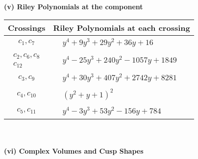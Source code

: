 \documentclass[1p]{elsarticle_modified}
\theoremstyle{definition}
\begin{document}
\newpage\renewcommand{\arraystretch}{1}
\flushleft \textbf{(v) Riley Polynomials at the component}\newline \\
\begin{tabular}{m{50pt}|m{274pt}}
Crossings & \hspace{64pt}Riley Polynomials at each crossing \\
\hline $$\begin{aligned}c_{1},c_{7}\end{aligned}$$&$\begin{aligned}
&y^4+9 y^3+29 y^2+36 y+16
\end{aligned}$\\
\hline $$\begin{aligned}c_{2},c_{6},c_{8}\\c_{12}\end{aligned}$$&$\begin{aligned}
&y^4-25 y^3+240 y^2-1057 y+1849
\end{aligned}$\\
\hline $$\begin{aligned}c_{3},c_{9}\end{aligned}$$&$\begin{aligned}
&y^4+30 y^3+407 y^2+2742 y+8281
\end{aligned}$\\
\hline $$\begin{aligned}c_{4},c_{10}\end{aligned}$$&$\begin{aligned}
&(y^2+y+1)^2
\end{aligned}$\\
\hline $$\begin{aligned}c_{5},c_{11}\end{aligned}$$&$\begin{aligned}
&y^4-3 y^3+53 y^2-156 y+784
\end{aligned}$\\
\hline
\end{tabular}\\~\\
\newpage\flushleft \textbf{(vi) Complex Volumes and Cusp Shapes}
\end{document}
